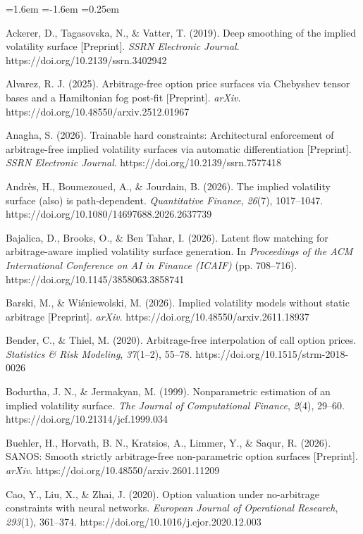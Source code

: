 \documentclass[11pt]{article}
\begin{document}
\begin{list}{}{\leftmargin=1.6em \itemindent=-1.6em \itemsep=0.25em}
\item Ackerer, D., Tagasovska, N., \& Vatter, T. (2019). Deep smoothing of the implied volatility surface [Preprint]. \textit{SSRN Electronic Journal}. https://doi.org/10.2139/ssrn.3402942
\item Alvarez, R. J. (2025). Arbitrage-free option price surfaces via Chebyshev tensor bases and a Hamiltonian fog post-fit [Preprint]. \textit{arXiv}. https://doi.org/10.48550/arxiv.2512.01967
\item Anagha, S. (2026). Trainable hard constraints: Architectural enforcement of arbitrage-free implied volatility surfaces via automatic differentiation [Preprint]. \textit{SSRN Electronic Journal}. https://doi.org/10.2139/ssrn.7577418
\item Andrès, H., Boumezoued, A., \& Jourdain, B. (2026). The implied volatility surface (also) is path-dependent. \textit{Quantitative Finance}, \textit{26}(7), 1017–1047. https://doi.org/10.1080/14697688.2026.2637739
\item Bajalica, D., Brooks, O., \& Ben Tahar, I. (2026). Latent flow matching for arbitrage-aware implied volatility surface generation. In \textit{Proceedings of the ACM International Conference on AI in Finance (ICAIF)} (pp. 708–716). https://doi.org/10.1145/3858063.3858741
\item Barski, M., \& Wiśniewolski, M. (2026). Implied volatility models without static arbitrage [Preprint]. \textit{arXiv}. https://doi.org/10.48550/arxiv.2611.18937
\item Bender, C., \& Thiel, M. (2020). Arbitrage-free interpolation of call option prices. \textit{Statistics \& Risk Modeling}, \textit{37}(1–2), 55–78. https://doi.org/10.1515/strm-2018-0026
\item Bodurtha, J. N., \& Jermakyan, M. (1999). Nonparametric estimation of an implied volatility surface. \textit{The Journal of Computational Finance}, \textit{2}(4), 29–60. https://doi.org/10.21314/jcf.1999.034
\item Buehler, H., Horvath, B. N., Kratsios, A., Limmer, Y., \& Saqur, R. (2026). SANOS: Smooth strictly arbitrage-free non-parametric option surfaces [Preprint]. \textit{arXiv}. https://doi.org/10.48550/arxiv.2601.11209
\item Cao, Y., Liu, X., \& Zhai, J. (2020). Option valuation under no-arbitrage constraints with neural networks. \textit{European Journal of Operational Research}, \textit{293}(1), 361–374. https://doi.org/10.1016/j.ejor.2020.12.003

\end{list}
\end{document}
